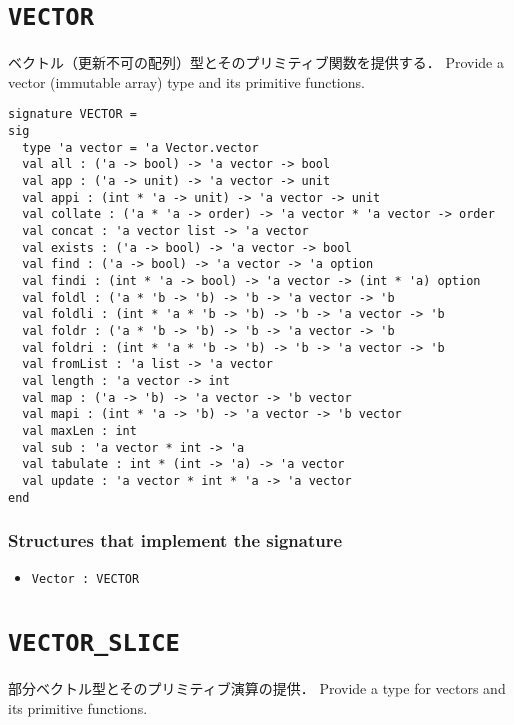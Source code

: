 \documentclass{jbook}
\newcommand{\txt}[2]{#2}
\newcommand{\code}[1]{\mbox{\large\tt #1}}
\newenvironment{program}{\begin{quote}\begin{tt}}%
                        {\end{tt}\end{quote}}
\newcommand{\signature}[2]{
\section{{\tt #1}}\label{section:reference:#2}
}
\newcommand{\Structure}{\subsubsection*{\txt{シグネチャを実装するストラクチャ}{Structures that implement the signature}}}
\begin{document}
\signature{VECTOR}{VECTOR}
\ifjp%
	ベクトル（更新不可の配列）型とそのプリミティブ関数を提供する．
\else%
	Provide a vector (immutable array) type and its primitive functions.
\fi%

\begin{verbatim}
signature VECTOR =
sig
  type 'a vector = 'a Vector.vector
  val all : ('a -> bool) -> 'a vector -> bool
  val app : ('a -> unit) -> 'a vector -> unit
  val appi : (int * 'a -> unit) -> 'a vector -> unit
  val collate : ('a * 'a -> order) -> 'a vector * 'a vector -> order
  val concat : 'a vector list -> 'a vector
  val exists : ('a -> bool) -> 'a vector -> bool
  val find : ('a -> bool) -> 'a vector -> 'a option
  val findi : (int * 'a -> bool) -> 'a vector -> (int * 'a) option
  val foldl : ('a * 'b -> 'b) -> 'b -> 'a vector -> 'b
  val foldli : (int * 'a * 'b -> 'b) -> 'b -> 'a vector -> 'b
  val foldr : ('a * 'b -> 'b) -> 'b -> 'a vector -> 'b
  val foldri : (int * 'a * 'b -> 'b) -> 'b -> 'a vector -> 'b
  val fromList : 'a list -> 'a vector
  val length : 'a vector -> int
  val map : ('a -> 'b) -> 'a vector -> 'b vector
  val mapi : (int * 'a -> 'b) -> 'a vector -> 'b vector
  val maxLen : int
  val sub : 'a vector * int -> 'a
  val tabulate : int * (int -> 'a) -> 'a vector
  val update : 'a vector * int * 'a -> 'a vector
end
\end{verbatim}

\Structure
\begin{itemize}
\item \code{Vector : VECTOR}
\begin{program}
\end{program}
\end{itemize}


\signature{VECTOR\_SLICE}{VECTORSLICE}
\ifjp%
	部分ベクトル型とそのプリミティブ演算の提供．
\else%
	Provide a type for vectors and its primitive functions.
\fi%
\end{document}
